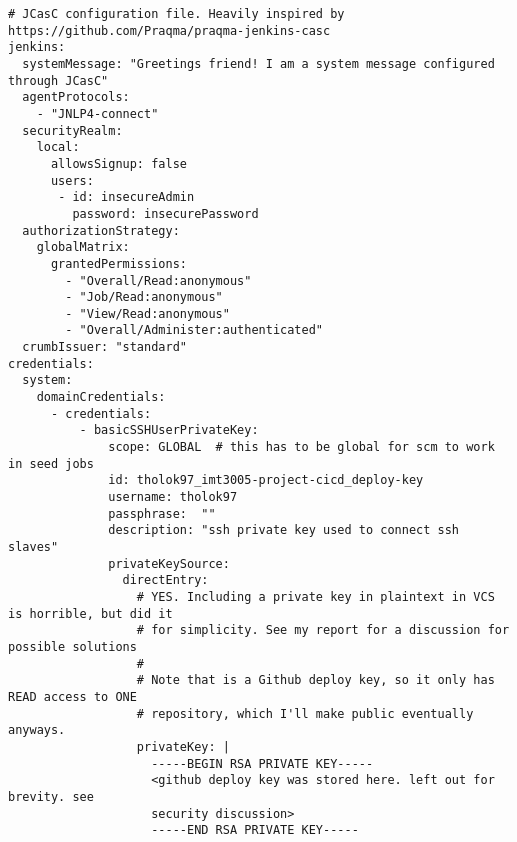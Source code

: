 \begin{verbatim}
# JCasC configuration file. Heavily inspired by https://github.com/Praqma/praqma-jenkins-casc
jenkins:
  systemMessage: "Greetings friend! I am a system message configured through JCasC"
  agentProtocols:
    - "JNLP4-connect"
  securityRealm:
    local:
      allowsSignup: false
      users:
       - id: insecureAdmin
         password: insecurePassword
  authorizationStrategy:
    globalMatrix:
      grantedPermissions:
        - "Overall/Read:anonymous"
        - "Job/Read:anonymous"
        - "View/Read:anonymous"
        - "Overall/Administer:authenticated"
  crumbIssuer: "standard"
credentials:
  system:
    domainCredentials:
      - credentials:
          - basicSSHUserPrivateKey:
              scope: GLOBAL  # this has to be global for scm to work in seed jobs
              id: tholok97_imt3005-project-cicd_deploy-key
              username: tholok97
              passphrase:  ""
              description: "ssh private key used to connect ssh slaves"
              privateKeySource:
                directEntry:
                  # YES. Including a private key in plaintext in VCS is horrible, but did it
                  # for simplicity. See my report for a discussion for possible solutions
                  #
                  # Note that is a Github deploy key, so it only has READ access to ONE
                  # repository, which I'll make public eventually anyways.
                  privateKey: |
                    -----BEGIN RSA PRIVATE KEY-----
                    <github deploy key was stored here. left out for brevity. see 
                    security discussion>
                    -----END RSA PRIVATE KEY-----


\end{verbatim}
